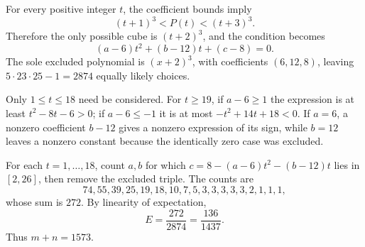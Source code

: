 For every positive integer $t$, the coefficient bounds imply
\[
(t+1)^3<P(t)<(t+3)^3.
\]
Therefore the only possible cube is $(t+2)^3$, and the condition becomes
\[
(a-6)t^2+(b-12)t+(c-8)=0.
\]
The sole excluded polynomial is $(x+2)^3$, with coefficients $(6,12,8)$, leaving $5\cdot23\cdot25-1=2874$ equally likely choices.

Only $1\le t\le18$ need be considered. For $t\ge19$, if $a-6\ge1$ the expression is at least $t^2-8t-6>0$; if $a-6\le-1$ it is at most $-t^2+14t+18<0$. If $a=6$, a nonzero coefficient $b-12$ gives a nonzero expression of its sign, while $b=12$ leaves a nonzero constant because the identically zero case was excluded.

For each $t=1,\ldots,18$, count $a,b$ for which $c=8-(a-6)t^2-(b-12)t$ lies in $[2,26]$, then remove the excluded triple. The counts are
\[
74,55,39,25,19,18,10,7,5,3,3,3,3,3,2,1,1,1,
\]
whose sum is $272$. By linearity of expectation,
\[
E=\dfrac{272}{2874}=\dfrac{136}{1437}.
\]
Thus $\boxed{m+n=1573}$.
